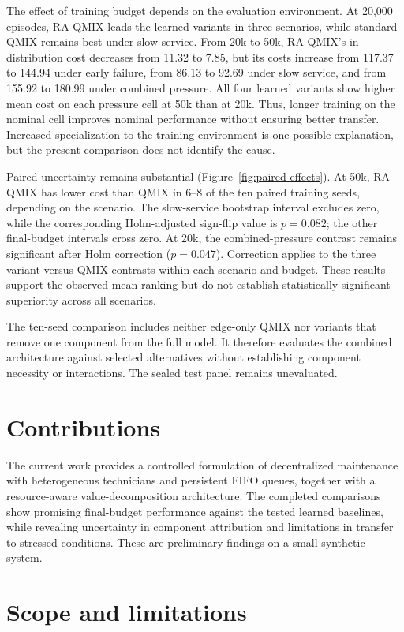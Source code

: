 \documentclass[11pt]{article}
\begin{document}
The effect of training budget depends on the evaluation environment. At 20,000 episodes, RA-QMIX leads the learned variants in three scenarios, while standard QMIX remains best under slow service. From 20k to 50k, RA-QMIX's in-distribution cost decreases from 11.32 to 7.85, but its costs increase from 117.37 to 144.94 under early failure, from 86.13 to 92.69 under slow service, and from 155.92 to 180.99 under combined pressure. All four learned variants show higher mean cost on each pressure cell at 50k than at 20k. Thus, longer training on the nominal cell improves nominal performance without ensuring better transfer. Increased specialization to the training environment is one possible explanation, but the present comparison does not identify the cause.

Paired uncertainty remains substantial (Figure~\ref{fig:paired-effects}). At 50k, RA-QMIX has lower cost than QMIX in 6--8 of the ten paired training seeds, depending on the scenario. The slow-service bootstrap interval excludes zero, while the corresponding Holm-adjusted sign-flip value is $p=0.082$; the other final-budget intervals cross zero. At 20k, the combined-pressure contrast remains significant after Holm correction ($p=0.047$). Correction applies to the three variant-versus-QMIX contrasts within each scenario and budget. These results support the observed mean ranking but do not establish statistically significant superiority across all scenarios.

The ten-seed comparison includes neither edge-only QMIX nor variants that remove one component from the full model. It therefore evaluates the combined architecture against selected alternatives without establishing component necessity or interactions. The sealed test panel remains unevaluated.

\section{Contributions}

The current work provides a controlled formulation of decentralized maintenance with heterogeneous technicians and persistent FIFO queues, together with a resource-aware value-decomposition architecture. The completed comparisons show promising final-budget performance against the tested learned baselines, while revealing uncertainty in component attribution and limitations in transfer to stressed conditions. These are preliminary findings on a small synthetic system.

\section{Scope and limitations}
\end{document}
